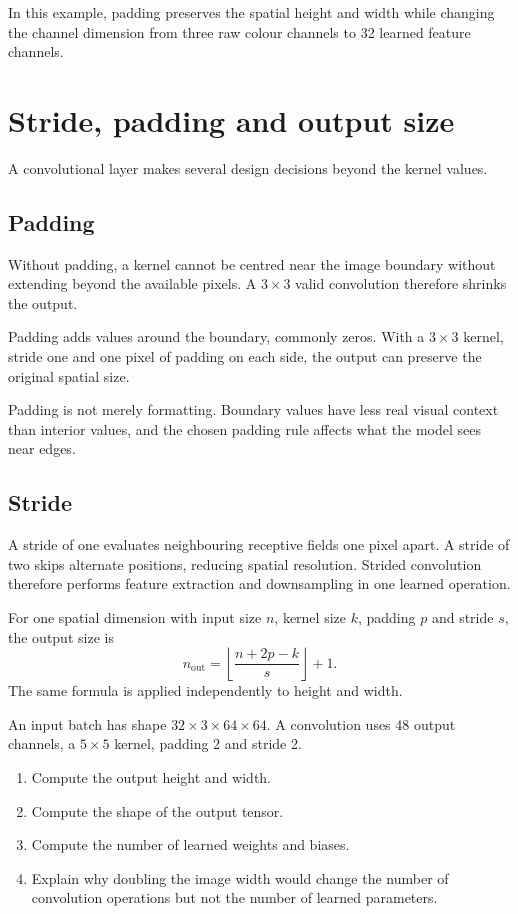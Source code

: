 In this example, padding preserves the spatial height and width while changing the channel dimension from three raw colour channels to 32 learned feature channels.

\section{Stride, padding and output size}

A convolutional layer makes several design decisions beyond the kernel values.

\subsection{Padding}

Without padding, a kernel cannot be centred near the image boundary without extending beyond the available pixels. A \(3\times3\) valid convolution therefore shrinks the output.

Padding adds values around the boundary, commonly zeros. With a \(3\times3\) kernel, stride one and one pixel of padding on each side, the output can preserve the original spatial size.

Padding is not merely formatting. Boundary values have less real visual context than interior values, and the chosen padding rule affects what the model sees near edges.

\subsection{Stride}

A stride of one evaluates neighbouring receptive fields one pixel apart. A stride of two skips alternate positions, reducing spatial resolution. Strided convolution therefore performs feature extraction and downsampling in one learned operation.

For one spatial dimension with input size \(n\), kernel size \(k\), padding \(p\) and stride \(s\), the output size is
\begin{equation}
  n_{\mathrm{out}}
  = \left\lfloor \frac{n+2p-k}{s} \right\rfloor + 1.
  \label{eq:week5-output-size}
\end{equation}
The same formula is applied independently to height and width.

\begin{optionalexercise}[title={Optional mathematics --- shapes and parameter counts}]
An input batch has shape \(32\times3\times64\times64\). A convolution uses 48 output channels, a \(5\times5\) kernel, padding 2 and stride 2.

\begin{enumerate}[leftmargin=*]
  \item Compute the output height and width.
  \item Compute the shape of the output tensor.
  \item Compute the number of learned weights and biases.
  \item Explain why doubling the image width would change the number of convolution operations but not the number of learned parameters.
\end{enumerate}
\end{optionalexercise}

